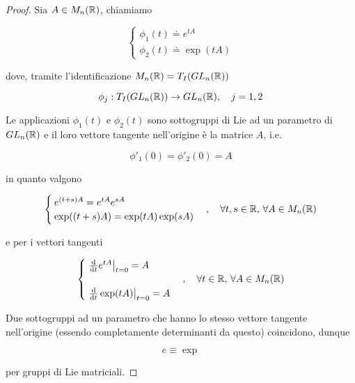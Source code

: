 \begin{proof}
	Sia $ A \in M_{n}(\mathbb{R}) $, chiamiamo
	
	\begin{equation}
		\begin{cases}
			\phi_{1}(t) \doteq e^{t A}\\
			\phi_{2}(t) \doteq \exp(t A)
		\end{cases}
	\end{equation}

	dove, tramite l'identificazione $ M_{n}(\mathbb{R}) = T_{I}(GL_{n}(\mathbb{R})) $
	
	\begin{equation}
		\phi_{j} : T_{I}(GL_{n}(\R)) \to GL_{n}(\R) \qcomma j=1,2
	\end{equation}

	Le applicazioni $ \phi_{1}(t) $ e $ \phi_{2}(t) $ sono sottogruppi di Lie ad un parametro di $ GL_{n}(\mathbb{R}) $ e il loro vettore tangente nell'origine è la matrice $ A $, i.e.
	
	\begin{equation}
		\phi'_{1}(0) = \phi'_{2}(0) = A
	\end{equation}

	in quanto valgono
	
	\begin{equation}
		\begin{cases}
			e^{(t+s) A} = e^{t A} e^{s A}\\
			\exp((t+s) A) = \exp(t A) \exp(s A)
		\end{cases}%
		\qcomma \forall t,s \in \R, \, \forall A \in M_{n}(\R)
	\end{equation}

	e per i vettori tangenti
	
	\begin{equation}
		\begin{cases}
			\eval{ \dv{t} e^{t A} }_{t=0} = A\\\\
			\eval{ \dv{t} \exp(t A) }_{t=0} = A
		\end{cases}%
		\qcomma \forall t \in \R, \, \forall A \in M_{n}(\R)
	\end{equation}

	Due sottogruppi ad un parametro che hanno lo stesso vettore tangente nell'origine (essendo completamente determinanti da questo) coincidono, dunque
	
	\begin{equation}
		e \equiv \exp
	\end{equation}

	per gruppi di Lie matriciali.
\end{proof}


